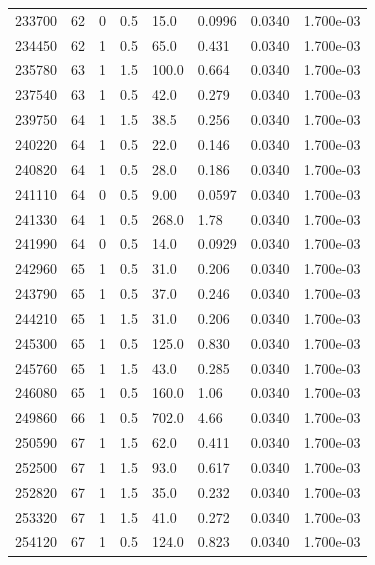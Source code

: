 \documentclass[preview]{standalone}
\begin{document}
{{{{{{{{\begin{tabular}{L{1.2cm}C{1.2cm} C{0.3cm}C{0.5cm} C{1.4cm}C{1.4cm} C{1.4cm}C{1.4cm}}
  233700  &    62  & 0     & 0.5 &  15.0  & 0.0996  & 0.0340 &  1.700e-03   \\ 
  234450  &    62  & 1     & 0.5 &  65.0  & 0.431  & 0.0340 &  1.700e-03   \\ 
  235780  &    63  & 1     & 1.5 &  100.0  & 0.664  & 0.0340 &  1.700e-03   \\ 
  237540  &    63  & 1     & 0.5 &  42.0  & 0.279  & 0.0340 &  1.700e-03   \\ 
  239750  &    64  & 1     & 1.5 &  38.5  & 0.256  & 0.0340 &  1.700e-03   \\ 
  240220  &    64  & 1     & 0.5 &  22.0  & 0.146  & 0.0340 &  1.700e-03   \\ 
  240820  &    64  & 1     & 0.5 &  28.0  & 0.186  & 0.0340 &  1.700e-03   \\ 
  241110  &    64  & 0     & 0.5 &  9.00  & 0.0597  & 0.0340 &  1.700e-03   \\ 
  241330  &    64  & 1     & 0.5 &  268.0  & 1.78  & 0.0340 &  1.700e-03   \\ 
  241990  &    64  & 0     & 0.5 &  14.0  & 0.0929  & 0.0340 &  1.700e-03   \\ 
  242960  &    65  & 1     & 0.5 &  31.0  & 0.206  & 0.0340 &  1.700e-03   \\ 
  243790  &    65  & 1     & 0.5 &  37.0  & 0.246  & 0.0340 &  1.700e-03   \\ 
  244210  &    65  & 1     & 1.5 &  31.0  & 0.206  & 0.0340 &  1.700e-03   \\ 
  245300  &    65  & 1     & 0.5 &  125.0  & 0.830  & 0.0340 &  1.700e-03   \\ 
  245760  &    65  & 1     & 1.5 &  43.0  & 0.285  & 0.0340 &  1.700e-03   \\ 
  246080  &    65  & 1     & 0.5 &  160.0  & 1.06  & 0.0340 &  1.700e-03   \\ 
  249860  &    66  & 1     & 0.5 &  702.0  & 4.66  & 0.0340 &  1.700e-03   \\ 
  250590  &    67  & 1     & 1.5 &  62.0  & 0.411  & 0.0340 &  1.700e-03   \\ 
  252500  &    67  & 1     & 1.5 &  93.0  & 0.617  & 0.0340 &  1.700e-03   \\ 
  252820  &    67  & 1     & 1.5 &  35.0  & 0.232  & 0.0340 &  1.700e-03   \\ 
  253320  &    67  & 1     & 1.5 &  41.0  & 0.272  & 0.0340 &  1.700e-03   \\ 
  254120  &    67  & 1     & 0.5 &  124.0  & 0.823  & 0.0340 &  1.700e-03   \\ 

\end{tabular}}}}}}}}}
\end{document}
